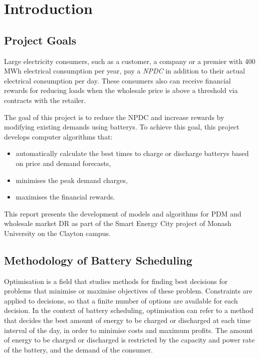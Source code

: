\chapter{Introduction}
\label{chp:introduction}


\section{Project Goals}

Large electricity consumers, such as a customer, a company or a premier with 400 MWh electrical consumption per year, pay a \textit{\gls{NPDC}} in addition to their actual electrical consumption per day. These consumers also can receive financial rewards for reducing loads when the wholesale price is above a threshold via contracts with the retailer. 

The goal of this project is to reduce the \gls{NPDC} and increase rewards by modifying existing demands using \glspl{battery}. 
To achieve this goal, this project develops computer algorithms that:
\begin{itemize}
	\item automatically calculate the best times to charge or discharge \glspl{battery} based on price and demand forecasts,
	
	\item minimises the peak demand charges,
	
	\item maximises the financial rewards. 
\end{itemize}

This report presents the development of models and algorithms for \gls{PDM} and wholesale market \gls{DR} as part of the Smart Energy City project of Monash University on the Clayton campus. 


 \section{Methodology of Battery Scheduling}
 \label{intro:methodology}

Optimisation is a field that studies methods for finding best decisions for problems that minimise or maximise objectives of these problem. Constraints are applied to decisions, so that a finite number of options are available for each decision.  In the context of battery scheduling, optimisation can refer to a method that decides the best amount of energy to be charged or discharged at each time interval of the day, in order to minimise costs and maximum profits. The amount of energy to be charged or discharged is restricted by the capacity and power rate of the \gls{battery}, and the demand of the consumer. 

